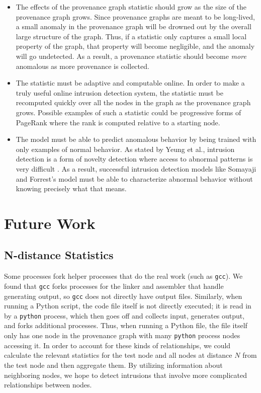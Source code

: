 \documentclass[10pt,twocolumn]{article}
\begin{document}
\begin{itemize}
\item The effects of the provenance graph statistic should grow as the size of the provenance graph grows. Since provenance graphs are meant to be long-lived, a small anomaly in the provenance graph will be drowned out by the overall large structure of the graph. Thus, if a statistic only captures a small local property of the graph, that property will become negligible, and the anomaly will go undetected. As a result, a provenance statistic should become {\em more} anomalous as more provenance is collected.

\item The statistic must be adaptive and computable online. In order to make a truly useful online intrusion detection system, the statistic must be recomputed quickly over all the nodes in the graph as the provenance graph grows. Possible examples of such a statistic could be progressive forms of PageRank where the rank is computed relative to a starting node.

\item The model must be able to predict anomalous behavior by being trained with only examples of normal behavior. As stated by Yeung et al., intrusion detection is a form of novelty detection where access to abnormal patterns is very difficult \cite{parzen}. As a result, successful intrusion detection models like Somayaji and Forrest's model must be able to characterize abnormal behavior without knowing precisely what that means.
\end{itemize}



%

\section{Future Work}

\subsection{N-distance Statistics}
Some processes fork helper processes that do the real work (such as \texttt{gcc}). We found that \texttt{gcc} forks processes for the linker and assembler that handle generating output, so \texttt{gcc} does not directly have output files. Similarly, when running a Python script, the code file itself is not directly executed; it is read in by a \texttt{python} process, which then goes off and collects input, generates output, and forks additional processes. Thus, when running a Python file, the file itself only has one node in the provenance graph with many \texttt{python} process nodes accessing it. In order to account for these kinds of relationships, we could calculate the relevant statistics for the test node and all nodes at distance $N$ from the test node and then aggregate them. By utilizing information about neighboring nodes, we hope to detect intrusions that involve more complicated relationships
between nodes.
\end{document}
